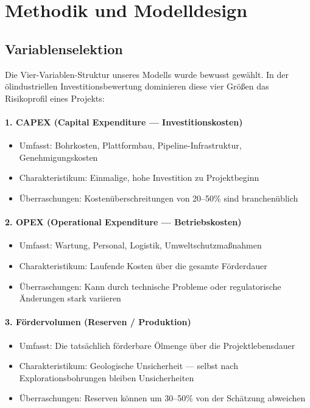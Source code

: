 \documentclass[11pt,a4paper]{article}
\begin{document}
\section{Methodik und Modelldesign}

\subsection{Variablenselektion}

Die Vier-Variablen-Struktur unseres Modells wurde bewusst gewählt. In der ölindustriellen Investitionsbewertung dominieren diese vier Größen das Risikoprofil eines Projekts:

\paragraph{1. CAPEX (Capital Expenditure — Investitionskosten)}
\begin{itemize}[itemsep=1pt]
  \item Umfasst: Bohrkosten, Plattformbau, Pipeline-Infrastruktur, Genehmigungskosten \cite{petrol}
  \item Charakteristikum: Einmalige, hohe Investition zu Projektbeginn
  \item Überraschungen: Kostenüberschreitungen von 20–50\% sind branchenüblich
\end{itemize}

\paragraph{2. OPEX (Operational Expenditure — Betriebskosten)}
\begin{itemize}[itemsep=1pt]
  \item Umfasst: Wartung, Personal, Logistik, Umweltschutzmaßnahmen
  \item Charakteristikum: Laufende Kosten über die gesamte Förderdauer \cite{petrol}
  \item Überraschungen: Kann durch technische Probleme oder regulatorische Änderungen stark variieren
\end{itemize}

\paragraph{3. Fördervolumen (Reserven / Produktion)}
\begin{itemize}[itemsep=1pt]
  \item Umfasst: Die tatsächlich förderbare Ölmenge über die Projektlebensdauer
  \item Charakteristikum: Geologische Unsicherheit — selbst nach Explorationsbohrungen bleiben Unsicherheiten
  \item Überraschungen: Reserven können um 30–50\% von der Schätzung abweichen
\end{itemize}
\end{document}
